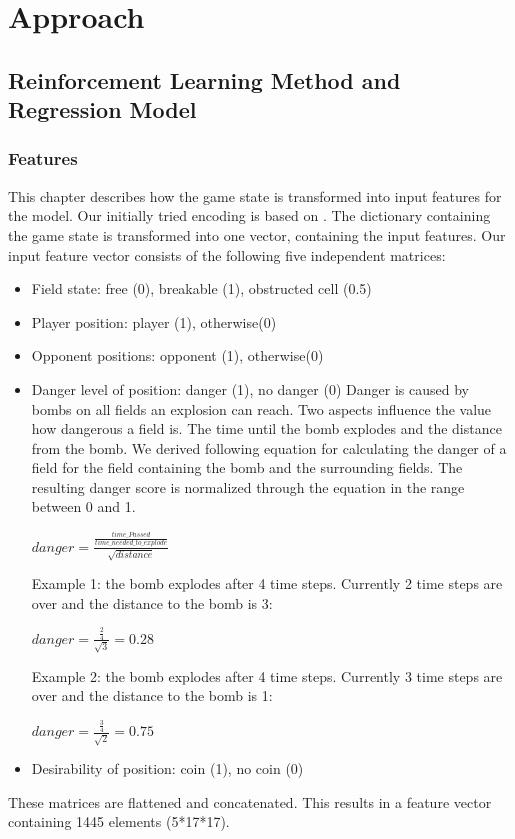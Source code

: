 \section{Approach} 
\label{approach}

\subsection{Reinforcement Learning Method and Regression Model} 
\label{ch:approachA}


\subsubsection{Features}
\label{ch:approachAa}

This chapter describes how the game state is transformed into input features for the model. 
Our initially tried encoding is based on \cite{Kormelink2018}. The dictionary containing the game state is transformed into one vector, containing the input features.
Our input feature vector consists of the following five independent matrices:
\begin{itemize}
	\item Field state: free (0), breakable (1), obstructed cell (0.5)
	\item Player position: player (1), otherwise(0)
	\item Opponent positions: opponent (1), otherwise(0)
	\item Danger level of position: danger (1), no danger (0) \newline
	Danger is caused by bombs on all fields an explosion can reach. Two aspects influence the value how dangerous a field is. The time until the bomb explodes and the distance from the bomb. We derived following equation for calculating the danger of a field for the field containing the bomb and the surrounding fields. The resulting danger score is normalized through the equation in the range between 0 and 1.
	
	$ danger = \frac{\frac{time\_Passed}{time\_needed\_to\_explode}}{\sqrt{distance}} $
	
	Example 1: the bomb explodes after 4 time steps. Currently 2 time steps are over and the distance to the bomb is 3:
	
	$ danger = \frac{\frac{2}{4}}{\sqrt{3}} = 0.28 $
	
	Example 2: the bomb explodes after 4 time steps. Currently 3 time steps are over and the distance to the bomb is 1:
	
	$ danger = \frac{\frac{3}{4}}{\sqrt{2}} = 0.75 $
	
	\item Desirability of position: coin (1), no coin (0)
\end{itemize}
These matrices are flattened and concatenated. This results in a feature vector containing 1445 elements (5*17*17).

